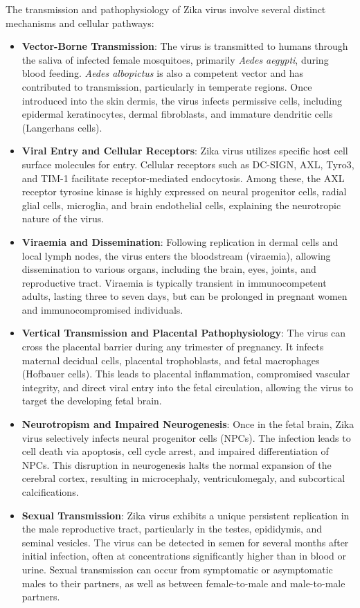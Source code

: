 The transmission and pathophysiology of Zika virus involve several distinct mechanisms and cellular pathways:
\begin{itemize}
    \item \textbf{Vector-Borne Transmission}: The virus is transmitted to humans through the saliva of infected female mosquitoes, primarily \textit{Aedes aegypti}, during blood feeding. \textit{Aedes albopictus} is also a competent vector and has contributed to transmission, particularly in temperate regions. Once introduced into the skin dermis, the virus infects permissive cells, including epidermal keratinocytes, dermal fibroblasts, and immature dendritic cells (Langerhans cells).
    \item \textbf{Viral Entry and Cellular Receptors}: Zika virus utilizes specific host cell surface molecules for entry. Cellular receptors such as DC-SIGN, AXL, Tyro3, and TIM-1 facilitate receptor-mediated endocytosis. Among these, the AXL receptor tyrosine kinase is highly expressed on neural progenitor cells, radial glial cells, microglia, and brain endothelial cells, explaining the neurotropic nature of the virus.
    \item \textbf{Viraemia and Dissemination}: Following replication in dermal cells and local lymph nodes, the virus enters the bloodstream (viraemia), allowing dissemination to various organs, including the brain, eyes, joints, and reproductive tract. Viraemia is typically transient in immunocompetent adults, lasting three to seven days, but can be prolonged in pregnant women and immunocompromised individuals.
    \item \textbf{Vertical Transmission and Placental Pathophysiology}: The virus can cross the placental barrier during any trimester of pregnancy. It infects maternal decidual cells, placental trophoblasts, and fetal macrophages (Hofbauer cells). This leads to placental inflammation, compromised vascular integrity, and direct viral entry into the fetal circulation, allowing the virus to target the developing fetal brain.
    \item \textbf{Neurotropism and Impaired Neurogenesis}: Once in the fetal brain, Zika virus selectively infects neural progenitor cells (NPCs). The infection leads to cell death via apoptosis, cell cycle arrest, and impaired differentiation of NPCs. This disruption in neurogenesis halts the normal expansion of the cerebral cortex, resulting in microcephaly, ventriculomegaly, and subcortical calcifications.
    \item \textbf{Sexual Transmission}: Zika virus exhibits a unique persistent replication in the male reproductive tract, particularly in the testes, epididymis, and seminal vesicles. The virus can be detected in semen for several months after initial infection, often at concentrations significantly higher than in blood or urine. Sexual transmission can occur from symptomatic or asymptomatic males to their partners, as well as between female-to-male and male-to-male partners.
\end{itemize}

